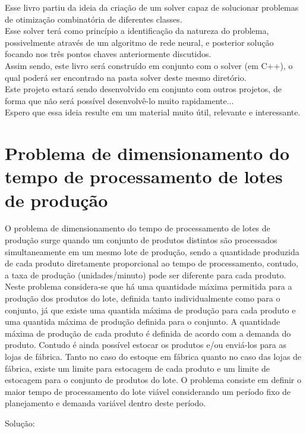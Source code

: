 \documentclass{book}
\begin{document}
Esse livro partiu da ideia da criação de um solver capaz de solucionar problemas de otimização combinatória de diferentes classes. \\

Esse solver terá como princípio a identificação da natureza do problema, possivelmente através de um algoritmo de rede neural, e posterior solução focando nos três pontos chaves anteriormente discutidos. \\

Assim sendo, este livro será construído em conjunto com o solver (em C++), o qual poderá ser encontrado na pasta solver deste mesmo diretório. \\

Este projeto estará sendo desenvolvido em conjunto com outros projetos, de forma que não será possível desenvolvê-lo muito rapidamente... \\

Espero que essa ideia resulte em um material muito útil, relevante e interessante.

\section{Problema de dimensionamento do tempo de processamento de lotes de produção}

O problema de dimensionamento do tempo de processamento de lotes de produção surge quando um conjunto de produtos distintos são processados simultaneamente em um mesmo lote de produção, sendo a quantidade produzida de cada produto diretamente proporcional ao tempo de processamento, contudo, a taxa de produção (unidades/minuto) pode ser diferente para cada produto. Neste problema considera-se que há uma quantidade máxima permitida para a produção dos produtos do lote, definida tanto individualmente como para o conjunto, já que existe uma quantida máxima de produção para cada produto e uma quantida máxima de produção definida para o conjunto. A quantidade máxima de produção de cada produto é definida de acordo com a demanda do produto. Contudo é ainda possível estocar os produtos e/ou enviá-los para as lojas de fábrica. Tanto no caso do estoque em fábrica quanto no caso das lojas de fábrica, existe um limite para estocagem de cada produto e um limite de estocagem para o conjunto de produtos do lote. O problema consiste em definir o maior tempo de processamento do lote viável considerando um período fixo de planejamento e demanda variável dentro deste período.

Solução:
\end{document}
